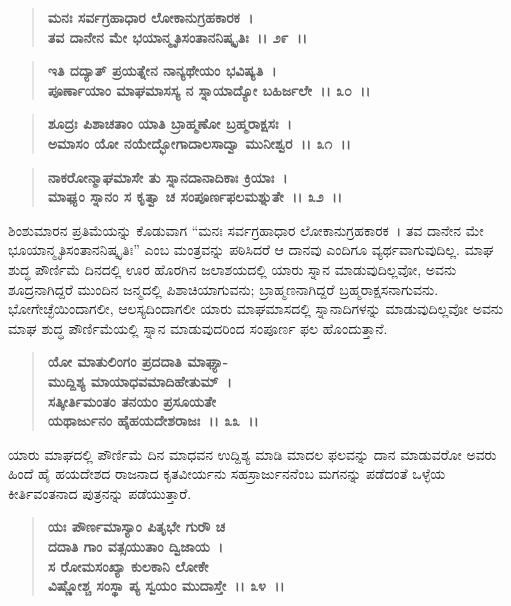 \begin{verse}
\textbf{ಮನಃ ಸರ್ವಗ್ರಹಾಧಾರ ಲೋಕಾನುಗ್ರಹಕಾರಕ~।}\\\textbf{ತವ ದಾನೇನ ಮೇ ಭಯಾನ್ಮೃತಿಸಂತಾನನಿಷ್ಕೃತಿಃ~।। ೨೯~।। }
\end{verse}

\begin{verse}
\textbf{ಇತಿ ದದ್ಯಾತ್ ಪ್ರಯತ್ನೇನ ನಾನ್ಯಥೇಯಂ ಭವಿಷ್ಯತಿ~।}\\\textbf{ಪೂರ್ಣಾಯಾಂ ಮಾಘಮಾಸಸ್ಯ ನ ಸ್ನಾಯಾದ್ಯೋ ಬಹಿರ್ಜಲೇ~।। ೩೦~।। }
\end{verse}

\begin{verse}
\textbf{ಶೂದ್ರಃ ಪಿಶಾಚತಾಂ ಯಾತಿ ಬ್ರಾಹ್ಮಣೋ ಬ್ರಹ್ಮರಾಕ್ಷಸಃ~।}\\\textbf{ಅಮಾಸಂ ಯೋ ನಯೇದ್ಭೋಗಾದಾಲಸಾದ್ವಾ ಮುನೀಶ್ವರ~।। ೩೧~।।} 
\end{verse}

\begin{verse}
\textbf{ನಾಕರೋನ್ಮಾಘಮಾಸೇ ತು ಸ್ನಾನದಾನಾದಿಕಾಃ ಕ್ರಿಯಾಃ~।}\\\textbf{ಮಾಘ್ಯಂ ಸ್ನಾನಂ ಸ ಕೃತ್ವಾ ಚ ಸಂಪೂರ್ಣಫಲಮಶ್ನುತೇ~।। ೩೨~।।}
\end{verse}

ಶಿಂಶುಮಾರನ ಪ್ರತಿಮೆಯನ್ನು ಕೊಡುವಾಗ “ಮನಃ ಸರ್ವಗ್ರಹಾಧಾರ ಲೋಕಾನುಗ್ರಹಕಾರಕ~। ತವ ದಾನೇನ ಮೇ ಭೂಯಾನ್ಮೃತಿಸಂತಾನನಿಷ್ಕೃತಿಃ” ಎಂಬ ಮಂತ್ರವನ್ನು ಪಠಿಸಿದರೆ ಆ ದಾನವು ಎಂದಿಗೂ ವ್ಯರ್ಥವಾಗುವುದಿಲ್ಲ. ಮಾಘ ಶುದ್ಧ ಪೌರ್ಣಿಮೆ ದಿನದಲ್ಲಿ ಊರ ಹೊರಗಿನ ಜಲಾಶಯದಲ್ಲಿ ಯಾರು ಸ್ನಾನ ಮಾಡುವುದಿಲ್ಲವೋ, ಅವನು ಶೂದ್ರನಾಗಿದ್ದರೆ ಮುಂದಿನ ಜನ್ಮದಲ್ಲಿ ಪಿಶಾಚಿಯಾಗುವನು; ಬ್ರಾಹ್ಮಣನಾಗಿದ್ದರೆ ಬ್ರಹ್ಮರಾಕ್ಷಸನಾಗುವನು. ಭೋಗೇಚ್ಛೆಯಿಂದಾಗಲೀ, ಆಲಸ್ಯದಿಂದಾಗಲೀ ಯಾರು ಮಾಘಮಾಸದಲ್ಲಿ ಸ್ನಾನಾದಿಗಳನ್ನು ಮಾಡುವುದಿಲ್ಲವೋ ಅವನು ಮಾಘ ಶುದ್ಧ ಪೌರ್ಣಿಮೆಯಲ್ಲಿ ಸ್ನಾನ ಮಾಡುವುದರಿಂದ ಸಂಪೂರ್ಣ ಫಲ ಹೊಂದುತ್ತಾನೆ.

\begin{verse}
\textbf{ಯೋ ಮಾತುಲಿಂಗಂ ಪ್ರದದಾತಿ ಮಾಘ್ಯಾ-}\\\textbf{ಮುದ್ದಿಶ್ಯ ಮಾಯಾಧವಮಾದಿಹೇತುಮ್~।}\\\textbf{ಸತ್ಕೀರ್ತಿಮಂತಂ ತನಯಂ ಪ್ರಸೂಯತೇ} \\\textbf{ಯಥಾರ್ಜುನಂ ಹೈಹಯದೇಶರಾಜಃ~।। ೩೩~।।}
\end{verse}

ಯಾರು ಮಾಘದಲ್ಲಿ ಪೌರ್ಣಿಮೆ ದಿನ ಮಾಧವನ ಉದ್ದಿಶ್ಯ ಮಾಡಿ ಮಾದಲ ಫಲವನ್ನು ದಾನ ಮಾಡುವರೋ ಅವರು ಹಿಂದೆ ಹೈ ಹಯದೇಶದ ರಾಜನಾದ ಕೃತವೀರ್ಯನು ಸಹಸ್ರಾರ್ಜುನನೆಂಬ ಮಗನನ್ನು ಪಡೆದಂತೆ ಒಳ್ಳೆಯ ಕೀರ್ತಿವಂತನಾದ ಪುತ್ರನನ್ನು ಪಡೆಯುತ್ತಾರೆ.

\begin{verse}
\textbf{ಯಃ ಪೌರ್ಣಮಾಸ್ಯಾಂ ಪಿತೃಭೇ ಗುರೌ‌ ಚ} \\\textbf{ದದಾತಿ ಗಾಂ ವತ್ಸಯುತಾಂ ದ್ವಿಜಾಯ~।}\\\textbf{ಸ ರೋಮಸಂಖ್ಯಾ ಕುಲಕಾನಿ ಲೋಕೇ} \\\textbf{ವಿಷ್ಣೋಶ್ಚ ಸಂಸ್ಥಾ ಪ್ಯ ಸ್ವಯಂ ಮುದಾಸ್ತೇ~।। ೩೪~।।}
\end{verse}


